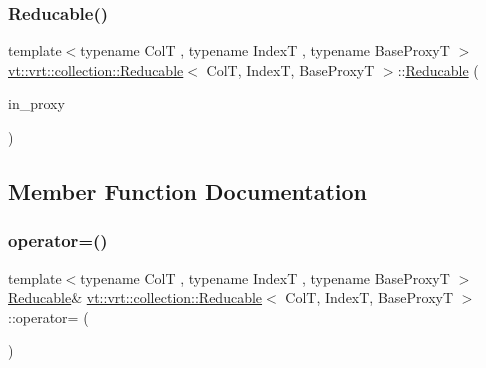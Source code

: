 \mbox{\label{structvt_1_1vrt_1_1collection_1_1_reducable_a658b587cdafda69c95ad0a2efe7a73fe}} 
\subsubsection{\texorpdfstring{Reducable()}{Reducable()}\hspace{0.1cm}{\footnotesize\ttfamily [4/4]}}
{\footnotesize\ttfamily template$<$typename ColT , typename IndexT , typename Base\+ProxyT $>$ \\
\hyperlink{structvt_1_1vrt_1_1collection_1_1_reducable}{vt\+::vrt\+::collection\+::\+Reducable}$<$ ColT, IndexT, Base\+ProxyT $>$\+::\hyperlink{structvt_1_1vrt_1_1collection_1_1_reducable}{Reducable} (\begin{DoxyParamCaption}\item[{\hyperlink{namespacevt_a1b417dd5d684f045bb58a0ede70045ac}{Virtual\+Proxy\+Type} const}]{in\+\_\+proxy }\end{DoxyParamCaption})\hspace{0.3cm}{\ttfamily [explicit]}}



\subsection{Member Function Documentation}
\mbox{\label{structvt_1_1vrt_1_1collection_1_1_reducable_a7df8661d0e353935f034c4c0174c0872}} 
\subsubsection{\texorpdfstring{operator=()}{operator=()}}
{\footnotesize\ttfamily template$<$typename ColT , typename IndexT , typename Base\+ProxyT $>$ \\
\hyperlink{structvt_1_1vrt_1_1collection_1_1_reducable}{Reducable}\& \hyperlink{structvt_1_1vrt_1_1collection_1_1_reducable}{vt\+::vrt\+::collection\+::\+Reducable}$<$ ColT, IndexT, Base\+ProxyT $>$\+::operator= (\begin{DoxyParamCaption}\item[{\hyperlink{structvt_1_1vrt_1_1collection_1_1_reducable}{Reducable}$<$ ColT, IndexT, Base\+ProxyT $>$ const \&}]{ }\end{DoxyParamCaption})\hspace{0.3cm}{\ttfamily [default]}}

